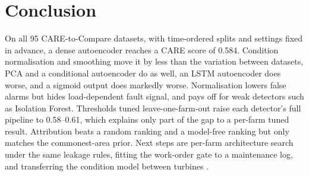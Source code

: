 \documentclass[conference]{IEEEtran}
\begin{document}
\section{Conclusion}
On all 95 CARE-to-Compare datasets, with time-ordered splits and settings fixed in advance, a dense autoencoder reaches a CARE score of 0.584. Condition normalisation and smoothing move it by less than the variation between datasets, PCA and a conditional autoencoder do as well, an LSTM autoencoder does worse, and a sigmoid output does markedly worse. Normalisation lowers false alarms but hides load-dependent fault signal, and pays off for weak detectors such as Isolation Forest. Thresholds tuned leave-one-farm-out raise each detector's full pipeline to 0.58--0.61, which explains only part of the gap to a per-farm tuned result. Attribution beats a random ranking and a model-free ranking but only matches the commonest-area prior. Next steps are per-farm architecture search under the same leakage rules, fitting the work-order gate to a maintenance log, and transferring the condition model between turbines \cite{r18}.
\end{document}
